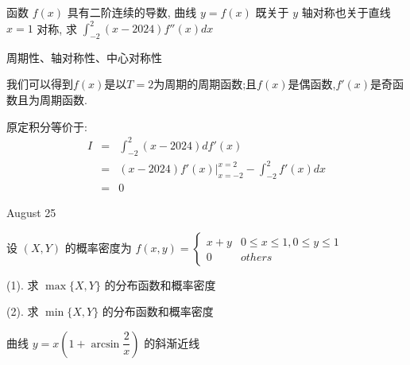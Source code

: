 \begin{example}[][Exam: 34.4.6]
	函数 $f(x)$ 具有二阶连续的导数, 曲线 $y=f(x)$ 既关于 $y$ 轴对称也关于直线 $x=1$ 对称,
	求 $\int_{-2}^{2}(x-2024)f''(x)dx$
\end{example}

\begin{solution}

	周期性、轴对称性、中心对称性
	
	我们可以得到$f(x)$是以$T=2$为周期的周期函数;且$f(x)$是偶函数,$f'(x)$是奇函数且为周期函数.
	
	原定积分等价于:  
	\begin{eqnarray*}
		I&=&\int_{-2}^{2}(x-2024)df'(x)\\
		&=&(x-2024)f'(x)|_{x=-2}^{x=2}-\int_{-2}^{2}f'(x)dx\\
		&=&0
	\end{eqnarray*}
\end{solution}


\textcolor{purplea}{August 25}

\begin{example}[][Exam: 34.4.7]
	设 $(X,Y)$ 的概率密度为 $f(x,y)=
	\begin{cases}
		x+y & 0\leq x\leq 1, 0\leq y\leq 1\\
		0 & others
	\end{cases}$

(1). 求 $\max\{X,Y\}$ 的分布函数和概率密度

(2). 求 $\min\{X,Y\}$ 的分布函数和概率密度
\end{example}

\begin{solution}
	
\end{solution}

\begin{example}[][Exam: 34.4.8]
	曲线 $y=x(1+\arcsin \dfrac{2}{x})$ 的斜渐近线
\end{example}

